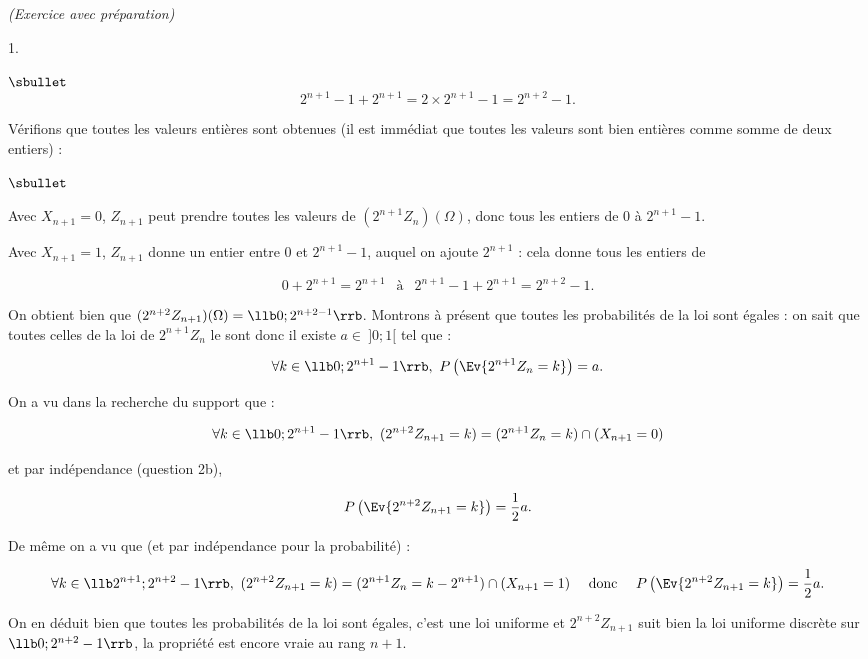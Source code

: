 \documentclass[11pt]{article}%
\begin{document}
\begin{exercice}{\it (Exercice avec préparation)}
\begin{noliste}{1.}
\begin{noliste}{$\sbullet$}
\[
 2^{n + 1} - 1 + 2^{n + 1} = 2 \times 2^{n + 1} - 1 = 2^{n + 2} - 1. 
\]

 Vérifions que toutes les valeurs entières sont obtenues (il est
immédiat que toutes les valeurs sont bien entières comme somme de deux
entiers) : \begin{noliste}{$\sbullet$}

 \item Avec $X_{n + 1} = 0$, $Z_{n + 1}$ peut prendre toutes les
valeurs de $( 2^{n + 1} Z_{n} ) ( \Omega)$, donc tous les entiers de 0
à $2^{n + 1} - 1$. \\

 \item Avec $X_{n + 1} = 1$, $Z_{n + 1}$ donne un entier entre 0 et
$2^{n + 1} - 1$, auquel on ajoute $2^{n + 1}$ : cela donne tous les
entiers de 
 
\[
 0 + 2^{n + 1} = 2^{n + 1} \ \ \text { à } \ \ 2^{n + 1} -1 + 2^{n + 1}
= 2^{n + 2} - 1. 
\]

 \end{noliste}

 On obtient bien que $( 2^{n + 2} Z_{n + 1} ) (\Omega) = \llb 0 ; 2^{n
+ 2 - 1 } \rrb$. Montrons à présent que toutes les probabilités de la
loi sont égales : on sait que toutes celles de la loi de $2^{n + 1}
Z_{n}$ le sont donc il existe $a \in \ ]0 ;1[$ tel que : 
 
\[
 \forall k \in \llb 0 ; 2^{n + 1} - 1 \rrb, \ P \left(\Ev{ 2^{n + 1}
Z_{n} = k }\right) = a. 
\]

 On a vu dans la recherche du support que : 
 
\[
 \forall k \in \llb 0 ; 2^{n + 1} - 1 \rrb, \ ( 2^{n + 2} Z_{n + 1} = k
) = ( 2^{n + 1} Z_{n} = k ) \cap (X_{n + 1} = 0 ) 
\]

 et par indépendance (question 2b), 
 
\[
 P \left(\Ev{ 2^{n + 2} Z_{n + 1} = k }\right) = \frac{ 1 }{ 2 } a. 
\]

 De même on a vu que (et par indépendance pour la probabilité) :
 
\[
 \forall k \in \llb 2^{n + 1} ; 2^{n + 2} - 1 \rrb, \ ( 2^{n + 2} Z_{n
+ 1} = k ) = ( 2^{n + 1} Z_{n} = k - 2^{n + 1} ) \cap (X_{n + 1} = 1 )
\ \ \ \text{ donc } \ \ \ P \left(\Ev{ 2^{n + 2} Z_{n + 1} = k }\right)
= \frac{ 1 }{ 2 } a. 
\]

 On en déduit bien que toutes les probabilités de la loi sont égales,
c'est une loi uniforme et $2^{n + 2} Z_{n + 1}$ suit bien la loi
uniforme discrète sur $\llb 0 ; 2^{n + 2} - 1 \rrb$, la propriété est
encore vraie au rang $n + 1$. \\


\end{noliste}
\end{noliste}
\end{exercice}
\end{document}
